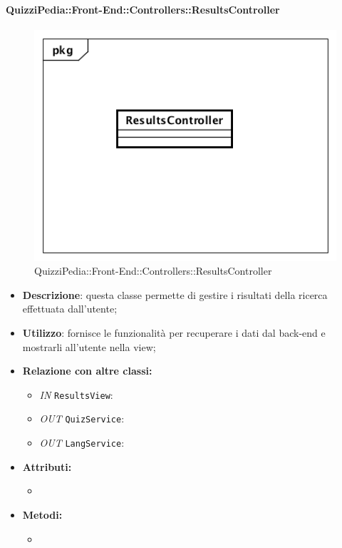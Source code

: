 \paragraph{QuizziPedia::Front-End::Controllers::ResultsController}
\begin{figure}
	\centering
	\includegraphics[scale=0.45]{UML/Classi/Front-End/QuizziPedia_Front-end_Controller_ResultsController.png}
	\caption{QuizziPedia::Front-End::Controllers::ResultsController}
\end{figure}
\begin{itemize}
	\item \textbf{Descrizione}: questa classe permette di gestire i risultati della ricerca effettuata dall'utente;
	\item \textbf{Utilizzo}: fornisce le funzionalità per recuperare i dati dal back-end e mostrarli all'utente nella view;
	\item \textbf{Relazione con altre classi:}
	\begin{itemize}
		\item \textit{IN} \texttt{ResultsView}: 
		\item \textit{OUT} \texttt{QuizService}:
		\item \textit{OUT} \texttt{LangService}: 
	\end{itemize}
	\item \textbf{Attributi:}
	\begin{itemize}
		\item 
	\end{itemize}
	\item \textbf{Metodi:}
	\begin{itemize}
		\item 
	\end{itemize}
\end{itemize}

